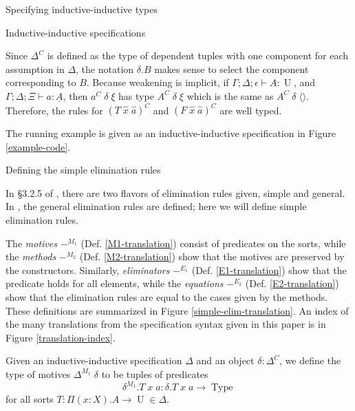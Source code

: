 \documentclass[runningheads]{llncs}
\DeclareMathOperator{\USet}{Type}
\DeclareMathOperator{\UU}{U}
\newcommand{\tac}{\vdash}
\def\emptytuple{\langle\rangle}
\begin{document}
{\begin{section}{Specifying inductive-inductive types}
\begin{subsection}{Inductive-inductive specifications}
\begin{definition}
Since $\Delta^C$ is defined as the type of dependent tuples with one component for each assumption in $\Delta$, the notation $\delta.B$ makes sense to select the component corresponding to $B$.
Because weakening is implicit, if $\Gamma ; \Delta ; \epsilon \tac A : \UU$, and $\Gamma ; \Delta ; \Xi \tac a : \underline{A}$, then $a^C\;\delta\;\xi$ has type $A^C\;\delta\;\xi$ which is the same as $A^C\;\delta\;\emptytuple$. Therefore, the rules for $(T\;\hat{x}\;\hat{a})^C$ and $(F\;\hat{x}\;\hat{a})^C$ are well typed. %

The running example is given as an inductive-inductive specification in Figure \ref{example-code}.

\end{definition}

\end{subsection}
\begin{subsection}{\label{simple-elim-section}Defining the simple elimination rules}
    
In \S3.2.5 of \citet{nordvallforsberg2013thesis}, there are two flavors of elimination rules given, simple and general. In \citet{KaposiKovacsHIITsyntax}, the general elimination rules are defined; here we will define simple elimination rules.

The \emph{motives} $-^{M_1}$ (Def. \ref{M1-translation}) consist of predicates on the sorts, while the \emph{methods} $-^{M_2}$ (Def. \ref{M2-translation}) show that the motives are preserved by the constructors. Similarly, \emph{eliminators} $-^{E_1}$ (Def. \ref{E1-translation}) show that the predicate holds for all elements, while the \emph{equations} $-^{E_2}$ (Def. \ref{E2-translation}) show that the elimination rules are equal to the cases given by the methods. These definitions are summarized in Figure \ref{simple-elim-translation}. An index of the many translations from the specification syntax given in this paper is in Figure \ref{translation-index}.

\begin{definition}
Given an inductive-inductive specification $\Delta$ and an object $\delta : \Delta^C$, we define the type of motives $\Delta^{M_1}\;\delta$ to be tuples of predicates \[\delta^{M_1}.T\;x\;a : \delta.T\;x\;a \to \USet\] for all sorts $T : \Pi(x : X).A \to \UU \in \Delta$.
\end{definition}


\end{subsection}
\end{section}}
\end{document}
